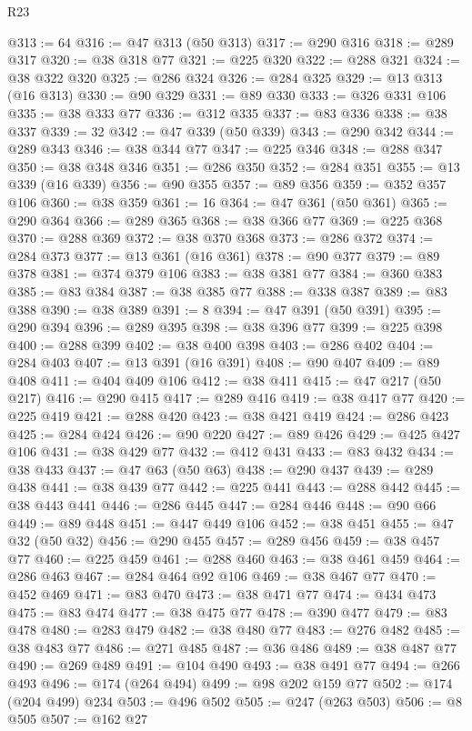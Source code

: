 \begin{lexlean}{R23}
\begin{coremodule}
{{{{{{{{{{{{{{{{{{{{{@313 := 64
@316 := @47 @313 (@50 @313)
@317 := @290 @316
@318 := @289 @317
@320 := @38 @318 @77
@321 := @225 @320
@322 := @288 @321
@324 := @38 @322 @320
@325 := @286 @324
@326 := @284 @325
@329 := @13 @313 (@16 @313)
@330 := @90 @329
@331 := @89 @330
@333 := @326 @331 @106
@335 := @38 @333 @77
@336 := @312 @335
@337 := @83 @336
@338 := @38 @337
@339 := 32
@342 := @47 @339 (@50 @339)
@343 := @290 @342
@344 := @289 @343
@346 := @38 @344 @77
@347 := @225 @346
@348 := @288 @347
@350 := @38 @348 @346
@351 := @286 @350
@352 := @284 @351
@355 := @13 @339 (@16 @339)
@356 := @90 @355
@357 := @89 @356
@359 := @352 @357 @106
@360 := @38 @359
@361 := 16
@364 := @47 @361 (@50 @361)
@365 := @290 @364
@366 := @289 @365
@368 := @38 @366 @77
@369 := @225 @368
@370 := @288 @369
@372 := @38 @370 @368
@373 := @286 @372
@374 := @284 @373
@377 := @13 @361 (@16 @361)
@378 := @90 @377
@379 := @89 @378
@381 := @374 @379 @106
@383 := @38 @381 @77
@384 := @360 @383
@385 := @83 @384
@387 := @38 @385 @77
@388 := @338 @387
@389 := @83 @388
@390 := @38 @389
@391 := 8
@394 := @47 @391 (@50 @391)
@395 := @290 @394
@396 := @289 @395
@398 := @38 @396 @77
@399 := @225 @398
@400 := @288 @399
@402 := @38 @400 @398
@403 := @286 @402
@404 := @284 @403
@407 := @13 @391 (@16 @391)
@408 := @90 @407
@409 := @89 @408
@411 := @404 @409 @106
@412 := @38 @411
@415 := @47 @217 (@50 @217)
@416 := @290 @415
@417 := @289 @416
@419 := @38 @417 @77
@420 := @225 @419
@421 := @288 @420
@423 := @38 @421 @419
@424 := @286 @423
@425 := @284 @424
@426 := @90 @220
@427 := @89 @426
@429 := @425 @427 @106
@431 := @38 @429 @77
@432 := @412 @431
@433 := @83 @432
@434 := @38 @433
@437 := @47 @63 (@50 @63)
@438 := @290 @437
@439 := @289 @438
@441 := @38 @439 @77
@442 := @225 @441
@443 := @288 @442
@445 := @38 @443 @441
@446 := @286 @445
@447 := @284 @446
@448 := @90 @66
@449 := @89 @448
@451 := @447 @449 @106
@452 := @38 @451
@455 := @47 @32 (@50 @32)
@456 := @290 @455
@457 := @289 @456
@459 := @38 @457 @77
@460 := @225 @459
@461 := @288 @460
@463 := @38 @461 @459
@464 := @286 @463
@467 := @284 @464 @92 @106
@469 := @38 @467 @77
@470 := @452 @469
@471 := @83 @470
@473 := @38 @471 @77
@474 := @434 @473
@475 := @83 @474
@477 := @38 @475 @77
@478 := @390 @477
@479 := @83 @478
@480 := @283 @479
@482 := @38 @480 @77
@483 := @276 @482
@485 := @38 @483 @77
@486 := @271 @485
@487 := @36 @486
@489 := @38 @487 @77
@490 := @269 @489
@491 := @104 @490
@493 := @38 @491 @77
@494 := @266 @493
@496 := @174 (@264 @494)
@499 := @98 @202 @159 @77
@502 := @174 (@204 @499) @234
@503 := @496 @502
@505 := @247 (@263 @503)
@506 := @8 @505
@507 := @162 @27
}}}}}}}}}}}}}}}}}}}}}
\end{coremodule}
\end{lexlean}
